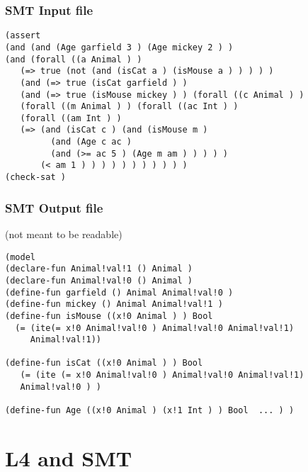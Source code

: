 \documentclass{beamer}
\begin{document}
  
\begin{frame}[fragile]\frametitle{SMT Input file}

\begin{verbatim}
(assert 
(and (and (Age garfield 3 ) (Age mickey 2 ) ) 
(and (forall ((a Animal ) ) 
   (=> true (not (and (isCat a ) (isMouse a ) ) ) ) ) 
   (and (=> true (isCat garfield ) ) 
   (and (=> true (isMouse mickey ) ) (forall ((c Animal ) ) 
   (forall ((m Animal ) ) (forall ((ac Int ) ) 
   (forall ((am Int ) ) 
   (=> (and (isCat c ) (and (isMouse m ) 
         (and (Age c ac )
         (and (>= ac 5 ) (Age m am ) ) ) ) ) 
       (< am 1 ) ) ) ) ) ) ) ) ) ) )
(check-sat )
\end{verbatim}

\end{frame}

\begin{frame}[fragile]\frametitle{SMT Output file}

   (not meant to be readable)
  \small
  \begin{verbatim}
(model 
(declare-fun Animal!val!1 () Animal ) 
(declare-fun Animal!val!0 () Animal ) 
(define-fun garfield () Animal Animal!val!0 ) 
(define-fun mickey () Animal Animal!val!1 ) 
(define-fun isMouse ((x!0 Animal ) ) Bool 
  (= (ite(= x!0 Animal!val!0 ) Animal!val!0 Animal!val!1) 
     Animal!val!1)) 

(define-fun isCat ((x!0 Animal ) ) Bool 
   (= (ite (= x!0 Animal!val!0 ) Animal!val!0 Animal!val!1)
   Animal!val!0 ) ) 

(define-fun Age ((x!0 Animal ) (x!1 Int ) ) Bool  ... ) )

\end{verbatim}  
\normalsize
\end{frame}


\section{L4 and SMT}
\end{document}
